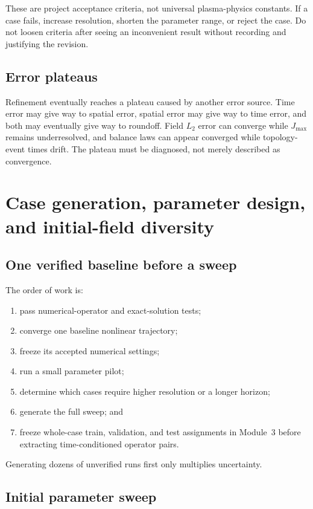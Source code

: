 \documentclass[11pt]{article}
\begin{document}
These are project acceptance criteria, not universal plasma-physics constants. If a case fails, increase resolution, shorten the parameter range, or reject the case. Do not loosen criteria after seeing an inconvenient result without recording and justifying the revision.

\subsection{Error plateaus}

Refinement eventually reaches a plateau caused by another error source. Time error may give way to spatial error, spatial error may give way to time error, and both may eventually give way to roundoff. Field $L_2$ error can converge while $J_{\max}$ remains underresolved, and balance laws can appear converged while topology-event times drift. The plateau must be diagnosed, not merely described as convergence.

\section{Case generation, parameter design, and initial-field diversity}
\label{sec:generation}

\subsection{One verified baseline before a sweep}

The order of work is:
\begin{enumerate}[label=\arabic*.]
  \item pass numerical-operator and exact-solution tests;
  \item converge one baseline nonlinear trajectory;
  \item freeze its accepted numerical settings;
  \item run a small parameter pilot;
  \item determine which cases require higher resolution or a longer horizon;
  \item generate the full sweep; and
  \item freeze whole-case train, validation, and test assignments in Module~3 before extracting time-conditioned operator pairs.
\end{enumerate}
Generating dozens of unverified runs first only multiplies uncertainty.

\subsection{Initial parameter sweep}
\end{document}

